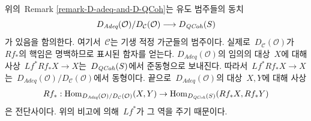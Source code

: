 \begin{remark}
\label{remark-conclusion}
위의\  Remark \ref{remark-D-adeq-and-D-QCoh}는 유도 범주들의 동치
$$
D_{\textit{Adeq}}(\mathcal{O})/D_\mathcal{C}(\mathcal{O})
\longrightarrow
D_{\mathit{QCoh}}(S)
$$
가 있음을 함의한다. 여기서\  $\mathcal{C}$는 기생 적정 가군들의
범주이다. 실제로\  $D_\mathcal{C}(\mathcal{O})$가\  $Rf_*$의 핵임은
명백하므로 표시된 함자를 얻는다. $D_{\textit{Adeq}}(\mathcal{O})$의
임의의 대상\  $X$에 대해 사상\  $Lf^*Rf_*X \to X$는\  $D_{\mathit{QCoh}}(S)$에서
준동형으로 보내진다. 따라서\  $Lf^*Rf_*X \to X$는\ 
$D_{\textit{Adeq}}(\mathcal{O})/D_\mathcal{C}(\mathcal{O})$에서
동형이다. 끝으로\  $D_{\textit{Adeq}}(\mathcal{O})$의 대상\  $X, Y$에
대해 사상
$$
Rf_* :
\mathop{\mathrm{Hom}}\nolimits_{D_{\textit{Adeq}}(\mathcal{O})/D_\mathcal{C}(\mathcal{O})}(X, Y)
\to
\mathop{\mathrm{Hom}}\nolimits_{D_{\mathit{QCoh}}(S)}(Rf_*X, Rf_*Y)
$$
은 전단사이다. 위의 비고에 의해\  $Lf^*$가 그 역을 주기 때문이다.
\end{remark}
















